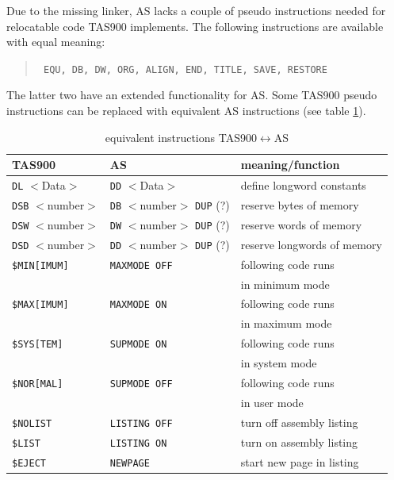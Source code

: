 \documentclass[12pt,twoside]{report}
\newcommand{\tty}[1]{{\tt #1}}
\newcommand{\asname}{{AS}}
\begin{document}
Due to the missing linker, \asname{} lacks a couple of pseudo instructions
needed for relocatable code TAS900 implements.  The following
instructions are available with equal meaning:
\begin{quote}\tt
   EQU, DB, DW, ORG, ALIGN, END, TITLE, SAVE, RESTORE
\rm\end{quote}
The latter two have an extended functionality for \asname{}.  Some TAS900
pseudo instructions can be replaced with equivalent \asname{} instructions (see
table \ref{TabTAS900}).
\par
\begin{table}[htbp]
\begin{center}\begin{tabular}{|l|l|l|}
\hline
TAS900           & \asname{}                  &     meaning/function \\
\hline
\hline
\tty{DL} $<$Data$>$    & \tty{DD} $<$Data$>$           & define longword constants \\
\hline
\tty{DSB} $<$number$>$ & \tty{DB} $<$number$>$ \tty{DUP} (?) & reserve bytes of memory \\
\hline
\tty{DSW} $<$number$>$ & \tty{DW} $<$number$>$ \tty{DUP} (?) & reserve words of memory \\
\hline
\tty{DSD} $<$number$>$ & \tty{DD} $<$number$>$ \tty{DUP} (?) & reserve longwords of memory \\
\hline
\tty{\$MIN[IMUM]}      & \tty{MAXMODE OFF}             & following code runs \\
                       &                               & in minimum mode \\
\hline
\tty{\$MAX[IMUM]}      & \tty{MAXMODE ON}              & following code runs \\
                       &                               & in maximum mode \\
\hline
\tty{\$SYS[TEM]}       & \tty{SUPMODE ON}              & following code runs \\
                       &                               & in system mode \\
\hline
\tty{\$NOR[MAL]}       & \tty{SUPMODE OFF}             & following code runs \\
                       &                               & in user mode \\
\hline
\tty{\$NOLIST}         & \tty{LISTING OFF}             & turn off assembly listing \\
\hline
\tty{\$LIST}           & \tty{LISTING ON}              & turn on assembly listing \\
\hline
\tty{\$EJECT}          & \tty{NEWPAGE}                 & start new page in listing \\
\hline
\end{tabular}\end{center}
\caption{equivalent instructions TAS900$\leftrightarrow$\asname{}\label{TabTAS900}}
\end{table}
\end{document}
